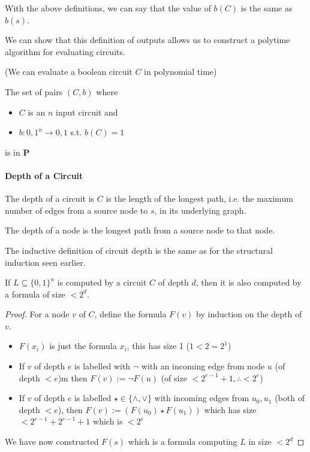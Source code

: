 \documentclass{report}
\begin{document}
With the above definitions, we can say that the value of $b(C)$ is the same as $b(s)$.

We can show that this definition of outputs allows us to construct a polytime algorithm for evaluating circuits.

\begin{proposition}(We can evaluate a boolean circuit $C$ in polynomial time)

  The set of pairs $(C,b)$ where
  \begin{itemize}
    \item $C$ is an $n$ input circuit and
    \item $b : { 0,1 }^{n} \rightarrow { 0,1 } $ s.t. $b(C) = 1$
  \end{itemize}
  is in $\mathbf{P} $
\end{proposition}

\paragraph{Depth of a Circuit}

The depth of a circuit is $C$ is the length of the longest path, i.e. the maximum number of edges from a source node to $s$, in its underlying graph.

The depth of a node is the longest path from a source node to that node.

The inductive definition of circuit depth is the same as for the structural induction seen earlier.

\begin{proposition}
  If $L\subseteq \{ 0,1 \} ^{n}$ is computed by a circuit $C$ of depth $d$, then it is also computed by a formula of size $< 2^{d}$.
\end{proposition}

\begin{proof}
  For a node $v$ of $C$, define the formula $F(v)$ by induction on the depth of $v$.

  \begin{itemize}
    \item $F(x_{i})$ is just the formula $x_{i}$, this has size 1 ($1 < 2 = 2^1$)
    \item If $v$ of depth $e$ is labelled with \(\neg\) with an incoming edge from node $u$ (of depth $< e$)m then $F(v) := \neg F(u)$ (of size $< 2^{e-1}+1, \therefore < 2^{e}$)
    \item If $v$ of depth $e$ is labelled $\star \in \{ \wedge,\vee \} $ with incoming edges from $u_{0},u_{1}$ (both of depth $< e$), then $F(v) := (F(u_{0})\star F(u_{1}))$ which has size $<2^{e-1}+2^{e-1} + 1$ which is $< 2^{e}$
  \end{itemize}

  We have now constructed $F(s)$ which is a formula computing $L$ in size $< 2^{d}$
\end{proof}
\end{document}
